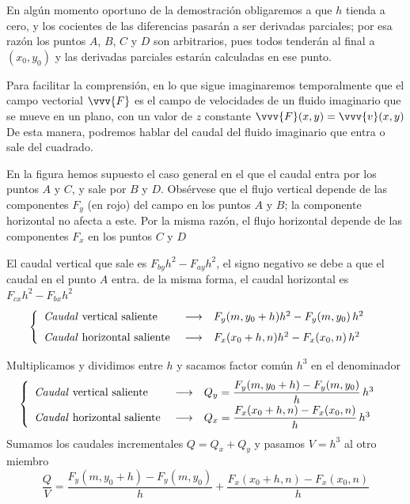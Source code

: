 En algún momento oportuno de la demostración obligaremos a que $h$ tienda a cero, y los
cocientes de las diferencias pasarán a ser derivadas parciales; por esa razón los
puntos $A$, $B$, $C$ y $D$ son arbitrarios, pues todos tenderán al final a $(x_0,y_0)$
y las derivadas parciales estarán calculadas en ese punto.

Para facilitar la comprensión, en lo que sigue imaginaremos temporalmente que el campo
vectorial $\vvv{F}$ es el campo de velocidades de un fluido imaginario que se mueve en un
plano, con un valor de $z$ constante\footnotemark{} $\vvv{F}(x,y) = \vvv{v}(x,y)$
De esta manera, podremos hablar del caudal del fluido imaginario que entra o sale del
cuadrado.

En la figura hemos supuesto el caso general en el que  el caudal entra por los puntos
$A$ y $C$, y sale por $B$ y $D$.
Obsérvese que el flujo vertical depende de las componentes $F_y$ (en rojo) del campo en
los puntos $A$ y $B$; la componente horizontal no afecta a este. Por la misma razón, el
flujo horizontal depende de las componentes $F_x$ en los puntos $C$ y $D$

El caudal vertical que sale es $F_{by} h^2 - F_{ay} h^2$, el signo negativo se debe a que
el caudal en el punto $A$ entra. de la misma forma, el caudal horizontal es
$F_{cx} h^2 - F_{bx} h^2$
\[
  \begin{cases}
    \begin{array}{lll}
      \text{\emph{Caudal} vertical saliente }
      &\longrightarrow
      &F_y(m, y_0+h) h^2 - F_y(m, y_0)\,h^2\\[1ex]
      \text{\emph{Caudal} horizontal saliente }
      &\longrightarrow
      &F_x(x_0+h, n) h^2 - F_x(x_0, n)\,h^2
    \end{array}
  \end{cases}
\]

Multiplicamos y dividimos entre $h$ y sacamos factor común $h^3$ en el denominador
\[
  \begin{cases}
    \begin{array}{lll}
      \text{\emph{Caudal} vertical saliente }
      &\longrightarrow
      &Q_y = \dfrac{F_y(m, y_0+h) - F_y(m, y_0)}{h}\,h^3\\[1ex]
      \text{\emph{Caudal} horizontal saliente }
      &\longrightarrow
      &Q_x = \dfrac{F_x(x_0+h, n) - F_x(x_0, n)}{h}\,h^3
    \end{array}
  \end{cases}
\]
Sumamos los caudales incrementales $Q=Q_x + Q_y$ y pasamos $V=h^3$ al otro miembro
\[
  \dfrac{Q}{V}
  = \dfrac{F_y(m, y_0+h) - F_y(m, y_0)}{h}
  + \dfrac{F_x(x_0+h, n) - F_x(x_0, n)}{h}
\]

